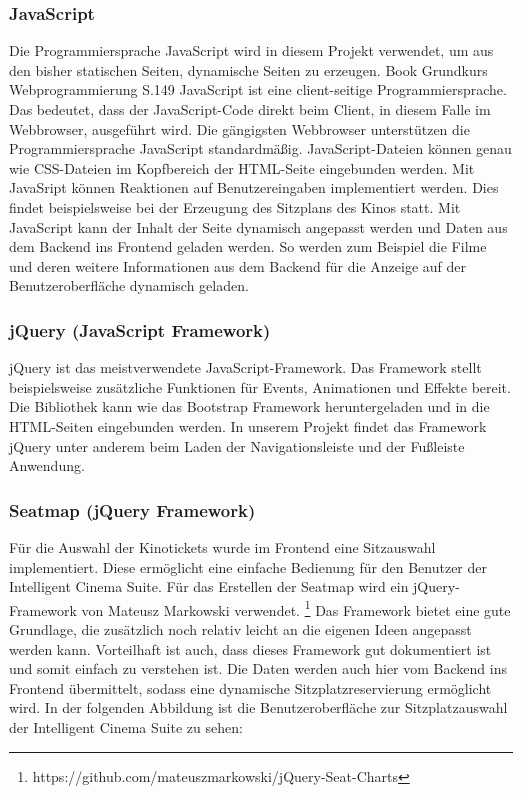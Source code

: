 	    \subsubsection{JavaScript}
	    Die Programmiersprache JavaScript wird in diesem Projekt verwendet, um aus den bisher statischen Seiten, dynamische Seiten zu erzeugen.  Book Grundkurs Webprogrammierung S.149 JavaScript ist eine client-seitige Programmiersprache. Das bedeutet, dass der JavaScript-Code direkt beim Client, in diesem Falle im Webbrowser, ausgeführt wird. Die gängigsten Webbrowser unterstützen die Programmiersprache JavaScript standardmäßig. JavaScript-Dateien können genau wie \acs{CSS}-Dateien im Kopfbereich der HTML-Seite eingebunden werden. Mit JavaSript können Reaktionen auf Benutzereingaben implementiert werden. Dies findet beispielsweise bei der Erzeugung des Sitzplans des Kinos statt. Mit JavaScript kann der Inhalt der Seite dynamisch angepasst werden und Daten aus dem Backend ins Frontend geladen werden. So werden zum Beispiel die Filme und deren weitere Informationen aus dem Backend für die Anzeige auf der Benutzeroberfläche dynamisch geladen. 
	    
	    \subsubsection{jQuery (JavaScript Framework)}
	    jQuery ist das meistverwendete JavaScript-Framework. Das Framework stellt beispielsweise zusätzliche Funktionen für Events, Animationen und Effekte bereit. Die Bibliothek kann wie das Bootstrap Framework heruntergeladen und in die HTML-Seiten eingebunden werden. In unserem Projekt findet das Framework jQuery unter anderem beim Laden der Navigationsleiste und der Fußleiste Anwendung.   
	    
	    \subsubsection{Seatmap (jQuery Framework)}
	    
	    Für die Auswahl der Kinotickets wurde im Frontend eine Sitzauswahl implementiert. Diese ermöglicht eine einfache Bedienung für den Benutzer der Intelligent Cinema Suite. Für das Erstellen der Seatmap wird ein jQuery-Framework von Mateusz Markowski verwendet. \footnote{https://github.com/mateuszmarkowski/jQuery-Seat-Charts} Das Framework bietet eine gute Grundlage, die zusätzlich noch relativ leicht an die eigenen Ideen angepasst werden kann. Vorteilhaft ist auch, dass dieses Framework gut dokumentiert ist und somit einfach zu verstehen ist. Die Daten werden auch hier vom Backend ins Frontend übermittelt, sodass eine dynamische Sitzplatzreservierung ermöglicht wird. In der folgenden Abbildung ist die Benutzeroberfläche zur Sitzplatzauswahl der Intelligent Cinema Suite zu sehen:
	    
